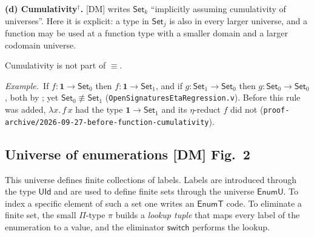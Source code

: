\documentclass[10pt,a4paper]{article}
\newcommand{\Set}{\mathsf{Set}}
\newcommand{\op}[1]{\mathsf{#1}}
\newcommand{\one}{\mathbf{1}}
\newcommand{\rn}[1]{{\normalfont\ttfamily\footnotesize\detokenize{#1}}}
\newcommand{\ex}{\par\smallskip\textit{Example.}\ }
\newcommand{\spi}{\pi}
\newcommand{\dg}{^{\dagger}}
\newcommand{\DM}{[DM]}
\newcommand{\ruleofd}[3]{\inferrule*[right={\rn{#1}$\dg$}]{#2}{#3}}
\begin{document}
\textbf{(d) Cumulativity$\dg$.} \DM{} writes $\Set_k$ ``implicitly assuming
cumulativity of universes''. Here it is explicit: a type in $\Set_j$ is also
in every larger universe, and a function may be used at a function type
with a smaller domain and a larger codomain universe.
Cumulativity is not part of $\equiv$.
\ex If $f:\one\to\Set_0$ then $f:\one\to\Set_1$, and if $g:\Set_1\to\Set_0$
then $g:\Set_0\to\Set_0$, both by \rn{ty_cumul_fun}; yet
$\Set_0\not\equiv\Set_1$ (\texttt{OpenSignaturesEtaRegression.v}). Before
this rule was added, $\lambda x.\,f\,x$ had the type $\one\to\Set_1$ and its
$\eta$-reduct $f$ did not
(\texttt{proof-archive/2026-09-27-before-function-cumulativity}).

\subsection{Universe of enumerations \DM{} Fig.~2}\label{sec:enum}
This universe defines finite collections of labels. Labels are introduced
through the type $\op{UId}$ and are used to define finite sets through the
universe $\op{EnumU}$. To index a specific element of such a set one writes
an $\op{EnumT}$ code. To eliminate a finite set, the small $\Pi$-type $\spi$
builds a \emph{lookup tuple} that maps every label of the enumeration to a
value, and the eliminator $\op{switch}$ performs the lookup.
\end{document}
